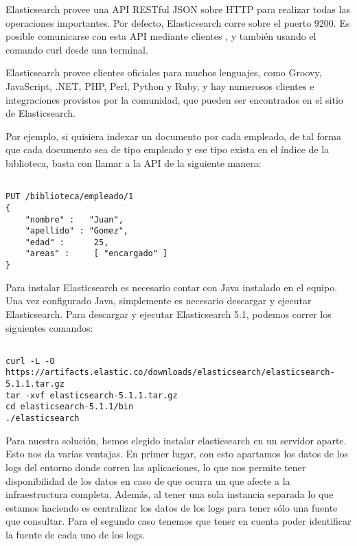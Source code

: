 Elasticsearch provee una API RESTful JSON sobre HTTP para realizar todas las
operaciones importantes. Por defecto, Elasticsearch corre sobre el puerto 9200.
Es posible comunicarse con esta API mediante clientes , y también
usando el comando curl desde una terminal.

Elasticsearch provee clientes oficiales para muchos lenguajes, como Groovy,
JavaScript, .NET, PHP, Perl, Python y Ruby, y hay numerosos clientes e
integraciones provistos por la comunidad, que pueden ser encontrados en el
sitio  de Elasticsearch.

Por ejemplo, si quisiera indexar un documento por cada empleado, de tal forma
que cada documento sea de tipo empleado y ese tipo exista en el índice de la
biblioteca, basta con llamar a la API de la siguiente manera:

\begin{lstlisting}

PUT /biblioteca/empleado/1
{
    "nombre" :   "Juan",
    "apellido" : "Gomez",
    "edad" :      25,
    "areas" :     [ "encargado" ]
}

\end{lstlisting}


Para instalar Elasticsearch es necesario contar con Java instalado en el
equipo.  Una vez configurado Java, simplemente es necesario descargar y
ejecutar Elasticsearch.  Para descargar y ejecutar Elasticsearch 5.1, podemos
correr los siguientes comandos:

\begin{lstlisting}

curl -L -O https://artifacts.elastic.co/downloads/elasticsearch/elasticsearch-5.1.1.tar.gz
tar -xvf elasticsearch-5.1.1.tar.gz
cd elasticsearch-5.1.1/bin
./elasticsearch

\end{lstlisting}

Para nuestra solución, hemos elegido instalar elasticsearch en un servidor
aparte. Esto nos da varias ventajas. En primer lugar, con esto apartamos los
datos de los logs del entorno donde corren las aplicaciones, lo que nos permite
tener disponibilidad de los datos en caso de que ocurra un que afecte a la
infraestructura completa. Además, al tener una sola instancia separada lo que
estamos haciendo es centralizar los datos de los logs para tener sólo una
fuente que consultar. Para el segundo caso tenemos que tener en cuenta poder
identificar la fuente de cada uno de los logs.

